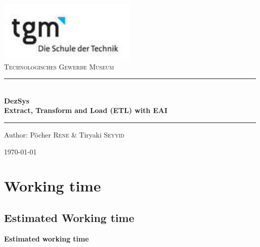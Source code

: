 \documentclass[12pt]{article}
\begin{document}
\begin{titlepage}
\begin{center}



\includegraphics[width=0.5\textwidth]{images/logo}\\[1cm]    

\textsc{\LARGE Technologisches Gewerbe Museum}\\[1.5cm]

\rule{12cm}{1mm}
{ \huge \bfseries  \\\large DezSys\\ \huge Extract, Transform and Load (ETL) with EAI \\[0.4cm] }

\rule{12cm}{1mm}

\noindent 
\vspace{5cm}

\begin{center}
\large
Author: 
Pöcher \textsc{Rene} \&
Tiryaki \textsc{Seyyid}
\end{center}

\vfill

{\large \today}

\end{center}
\end{titlepage}

\tableofcontents


\ohead{\headmark}

\newpage



\section{Working time}
\subsection{Estimated Working time}
\begin{center}
\textbf{Estimated working time}
\end{center}
\end{document}
